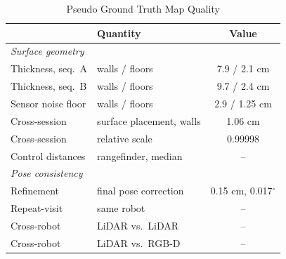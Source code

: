 \begin{table}[!t]
\centering
\caption{Pseudo Ground Truth Map Quality}
\label{tab:gt}
\begin{tabular}{llc}
\toprule
& Quantity & Value \\
\midrule
\multicolumn{3}{l}{\emph{Surface geometry}} \\
\quad Thickness, seq.\ A & walls / floors & 7.9 / 2.1 cm \\
\quad Thickness, seq.\ B & walls / floors & 9.7 / 2.4 cm \\
\quad Sensor noise floor & walls / floors & 2.9 / 1.25 cm \\
\quad Cross-session      & surface placement, walls & 1.06 cm \\
\quad Cross-session      & relative scale & 0.99998 \\
\quad Control distances  & rangefinder, median & -- \\
\midrule
\multicolumn{3}{l}{\emph{Pose consistency}} \\
\quad Refinement         & final pose correction & 0.15 cm, 0.017$^\circ$ \\
\quad Repeat-visit       & same robot & -- \\
\quad Cross-robot        & LiDAR vs.\ LiDAR & -- \\
\quad Cross-robot        & LiDAR vs.\ RGB-D & -- \\
\bottomrule
\end{tabular}
\end{table}
